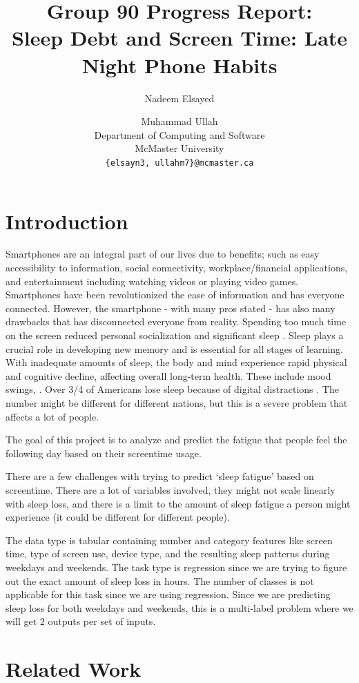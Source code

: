 \documentclass[11pt]{article}
\title{Group 90 Progress Report:\\Sleep Debt and Screen Time: Late Night Phone Habits}
\author{
  Nadeem Elsayed \and Muhammad Ullah \\
  Department of Computing and Software \\
  McMaster University \\
  \texttt{\{elsayn3, ullahm7\}@mcmaster.ca}
}
\begin{document}
\maketitle

\section{Introduction}
\label{sec:intro}

Smartphones are an integral part of our lives due to benefits; such as easy accessibility to information, social connectivity, workplace/financial applications, and entertainment including watching videos or playing video games. Smartphones have been revolutionized the ease of information and has everyone connected. However, the smartphone - with many pros stated - has also many drawbacks that has disconnected everyone from reality. Spending too much time on the screen reduced personal socialization and significant sleep \citep{cbc2026}. Sleep plays a crucial role in developing new memory and is essential for all stages of learning. With inadequate amounts of sleep, the body and mind experience rapid physical and cognitive decline, affecting overall long-term health. These include mood swings, \citep{shah2024effects}. Over 3/4 of Americans lose sleep because of digital distractions \citep{newswise2026}. The number might be different for different nations, but this is a severe problem that affects a lot of people. 

The goal of this project is to analyze and predict the fatigue that people feel the following day based on their screentime usage. 

There are a few challenges with trying to predict `sleep fatigue' based on screentime. There are a lot of variables involved, they might not scale linearly with sleep loss, and there is a limit to the amount of sleep fatigue a person might experience (it could be different for different people). 

The data type is tabular containing number and category features like screen time, type of screen use, device type, and the resulting sleep patterns during weekdays and weekends. The task type is regression since we are trying to figure out the exact amount of sleep loss in hours. The number of classes is not applicable for this task since we are using regression. Since we are predicting sleep loss for both weekdays and weekends, this is a multi-label problem where we will get 2 outputs per set of inputs.

\section{Related Work}
\end{document}
